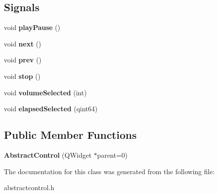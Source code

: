 \subsection*{Signals}
\begin{DoxyCompactItemize}
\item 
\hypertarget{class_abstract_control_ad2e9ced2f1cc8843b0d41aed65147940}{void {\bfseries play\-Pause} ()}\label{class_abstract_control_ad2e9ced2f1cc8843b0d41aed65147940}

\item 
\hypertarget{class_abstract_control_a2d22cb619310c6e5124714f50752785e}{void {\bfseries next} ()}\label{class_abstract_control_a2d22cb619310c6e5124714f50752785e}

\item 
\hypertarget{class_abstract_control_a4d4c1291abf6badfcc50bc5b0f29a4e7}{void {\bfseries prev} ()}\label{class_abstract_control_a4d4c1291abf6badfcc50bc5b0f29a4e7}

\item 
\hypertarget{class_abstract_control_a8deefe7ec20ba2828132c0f4dd7ec2d2}{void {\bfseries stop} ()}\label{class_abstract_control_a8deefe7ec20ba2828132c0f4dd7ec2d2}

\item 
\hypertarget{class_abstract_control_ab87486a10333c41af89e9f2f1e4aa00b}{void {\bfseries volume\-Selected} (int)}\label{class_abstract_control_ab87486a10333c41af89e9f2f1e4aa00b}

\item 
\hypertarget{class_abstract_control_a4ef5f5771ae42561aec365a9aabe4615}{void {\bfseries elapsed\-Selected} (qint64)}\label{class_abstract_control_a4ef5f5771ae42561aec365a9aabe4615}

\end{DoxyCompactItemize}
\subsection*{Public Member Functions}
\begin{DoxyCompactItemize}
\item 
\hypertarget{class_abstract_control_a2caef38ad55c0589a073a3ead352c7ad}{{\bfseries Abstract\-Control} (Q\-Widget $\ast$parent=0)}\label{class_abstract_control_a2caef38ad55c0589a073a3ead352c7ad}

\end{DoxyCompactItemize}


The documentation for this class was generated from the following file\-:\begin{DoxyCompactItemize}
\item 
abstractcontrol.\-h\end{DoxyCompactItemize}
